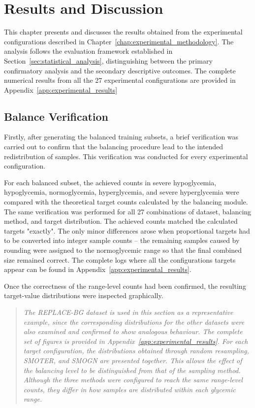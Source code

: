 
\chapter{Results and Discussion}
\label{chap:experimental_results}

This chapter presents and discusses the results obtained from the experimental configurations described in Chapter~\ref{chap:experimental_methodology}. The analysis follows the evaluation framework established in Section~\ref{sec:statistical_analysis}, distinguishing between the primary confirmatory analysis and the secondary descriptive outcomes. The complete numerical results from all the 27 experimental configurations are provided in Appendix~\ref{app:experimental_results}

\section{Balance Verification}
\label{sec:balance_verification}

Firstly, after generating the balanced training subsets, a brief verification was carried out to confirm that the balancing procedure lead to the intended redistribution of samples. This verification was conducted for every experimental configuration.

For each balanced subset, the achieved counts in severe hypoglycemia, hypoglycemia, normoglycemia, hyperglycemia, and severe hyperglycemia were compared with the theoretical target counts calculated by the balancing module. The same verification was performed for all 27 combinations of dataset, balancing method, and target distribution. The achieved counts matched the calculated targets "exactly". The only minor differences arose when proportional targets had to be converted into integer sample counts -- the remaining samples caused by rounding were assigned to the normoglycemic range so that the final combined size remained correct. The complete logs where all the configurations targets appear can be found in Appendix~\ref{app:experimental_results}.

Once the correctness of the range-level counts had been confirmed, the resulting target-value distributions were inspected graphically.

\begin{quote}
\small
\textit{The REPLACE-BG dataset is used in this section as a representative example, since the corresponding distributions for the other datasets were also examined and confirmed to show analogous behaviour. The complete set of figures is provided in Appendix~\ref{app:experimental_results}. For each target configuration, the distributions obtained through random resampling, SMOTER, and SMOGN are presented together. This allows the effect of the balancing level to be distinguished from that of the sampling method. Although the three methods were configured to reach the same range-level counts, they differ in how samples are distributed within each glycemic range.}
\end{quote}


